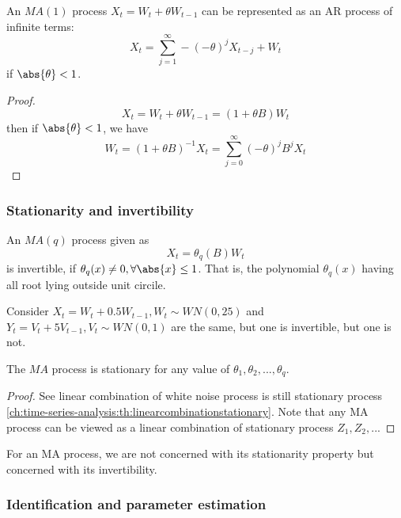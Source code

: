 \begin{lemma}\label{ch:time-series-analysis:th:ARRerepresentationMA(1)Process}
An $MA(1)$ process $X_t = W_t + \theta W_{t-1}$ can be represented as an AR process of infinite terms: 
$$X_t = \sum_{j=1}^\infty -(-\theta)^j X_{t-j} + W_t$$
if $\abs{\theta}<1$.
\end{lemma}
\begin{proof}
$$X_t = W_t + \theta W_{t-1} = (1+\theta B)W_t$$
then if $\abs{\theta} < 1$, 
we have
$$W_t = (1+\theta B)^{-1}X_t = \sum_{j=0}^\infty (-\theta)^j B^j X_t$$
\end{proof}


\subsubsection{Stationarity and invertibility}
\begin{lemma}[invertibility of MA]
An $MA(q)$ process given as
$$X_t = \theta_q(B)W_t$$
is invertible, if $\theta_q(x) \neq 0, \forall \abs{x} \leq 1$. That is, the polynomial $\theta_q(x)$ having all root lying outside unit circile.
\end{lemma}

\begin{remark}
Consider $X_t = W_t + 0.5W_{t-1},W_t \sim WN(0,25)$ and $Y_t = V_t+5V_{t-1},V_t \sim WN(0,1)$
are the same, but one is invertible, but one is not.
\end{remark}


\begin{lemma}\label{ch:time-series-analysis:th:MAprocessisstationary}\cite[59]{tsay2005analysis}
The $MA$ process is stationary for any value of $\theta_1,\theta_2,...,\theta_q$.
\end{lemma}
\begin{proof}
See linear combination of white noise process is still stationary process \autoref{ch:time-series-analysis:th:linearcombinationstationary}. Note that any MA process can be viewed as a linear combination of stationary process $Z_1,Z_2,...$
\end{proof}


\begin{remark}
For an MA process, we are not concerned with its stationarity property but concerned with its invertibility.
\end{remark}

\subsubsection{Identification and parameter estimation}


